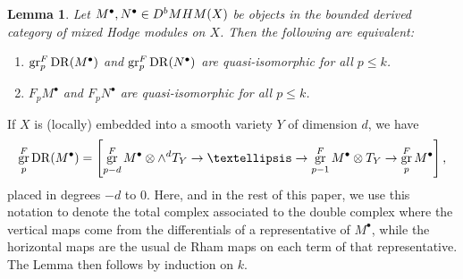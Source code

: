 \documentclass[11pt]{amsart}
\newtheorem{lemma}[equation]{Lemma}
\theoremstyle{definition}
\theoremstyle{plain}
\DeclareMathOperator{\DR}{DR}
\DeclareMathOperator{\gr}{{\rm gr}}
\begin{document}
\begin{lemma}\label{lem:MHM-general}
 Let $M^\bullet, N^\bullet  \in {\rm D}^b {\rm MHM} (X)$ be objects in the bounded derived category of mixed Hodge modules on $X$. Then the following are equivalent:
    \begin{enumerate}
        \item $\gr^F_p \DR(M^\bullet)$ and  $\gr^F_p \DR(N^\bullet)$ are quasi-isomorphic for all $p\le k$.
        \item $F_p M^\bullet$ and $F_p N^\bullet$ are quasi-isomorphic for all $p\le k$. 
    \end{enumerate}
\end{lemma}

If $X$ is (locally) embedded into a smooth variety $Y$ of dimension $d$, we have
$$ \gr^F_{p} \DR(M^\bullet) =   \left[\gr^F_{p-d}M^\bullet  \otimes \wedge^{d} T_Y \to \dots \to \gr^F_{p-1} M^\bullet \otimes T_Y \to 
\gr^F_{p} M^\bullet \right],$$
placed in degrees $-d$ to $0$. Here, and in the rest of this paper, we use this notation to denote the total complex associated to the double complex where the vertical 
maps come from the differentials of a representative of $M^\bullet$, while the horizontal maps are the usual de Rham maps on each term of that representative. The Lemma then follows  by induction on $k$.

\end{document}

